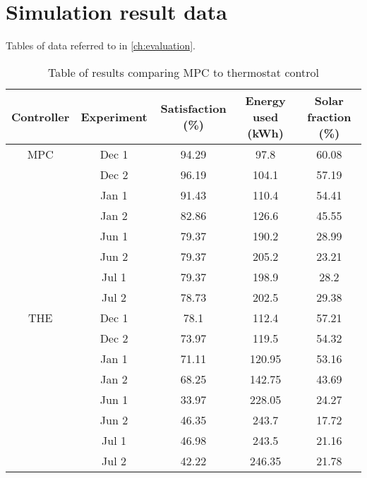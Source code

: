 \chapter{Simulation result data}
\label{app:data}

Tables of data referred to in \autoref{ch:evaluation}.

\begin{table}
   \centering
   \begin{tabular}{c c c c c}
      Controller & Experiment & Satisfaction (\%) & Energy used (kWh) & Solar fraction (\%) \\ \hline
      MPC & Dec 1 & 94.29 & 97.8   & 60.08 \\
          & Dec 2 & 96.19 & 104.1  & 57.19 \\
          & Jan 1 & 91.43 & 110.4  & 54.41 \\
          & Jan 2 & 82.86 & 126.6  & 45.55 \\
          & Jun 1 & 79.37 & 190.2  & 28.99 \\
          & Jun 2 & 79.37 & 205.2  & 23.21 \\
          & Jul 1 & 79.37 & 198.9  & 28.2  \\
          & Jul 2 & 78.73 & 202.5  & 29.38 \\
      THE & Dec 1 & 78.1  & 112.4  & 57.21 \\
          & Dec 2 & 73.97 & 119.5  & 54.32 \\
          & Jan 1 & 71.11 & 120.95 & 53.16 \\
          & Jan 2 & 68.25 & 142.75 & 43.69 \\
          & Jun 1 & 33.97 & 228.05 & 24.27 \\
          & Jun 2 & 46.35 & 243.7  & 17.72 \\
          & Jul 1 & 46.98 & 243.5  & 21.16 \\
          & Jul 2 & 42.22 & 246.35 & 21.78
   \end{tabular}
   \caption{Table of results comparing MPC to thermostat control}
   \label{tab:comparison}
\end{table}

